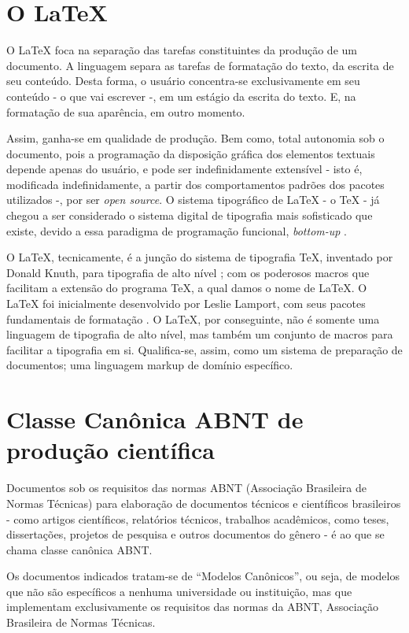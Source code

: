 \documentclass[
12pt,				%
openright,			%
oneside,			%
a4paper,			%
english,			%
french,				%
spanish,			%
brazil,				%
]{abntex2}
\begin{document}
\section{O \LaTeX}

O \LaTeX{} foca na separação das tarefas constituintes da produção de um
documento. A linguagem separa as tarefas de formatação do texto, da
escrita de seu conteúdo. Desta forma, o usuário concentra-se
exclusivamente em seu conteúdo - o que vai escrever -, em um
estágio da escrita do texto. E, na formatação de sua aparência, em
outro momento.

Assim, ganha-se em
qualidade de produção. Bem como, total autonomia sob o documento, pois
a programação da disposição gráfica dos elementos textuais depende apenas do usuário, e
pode ser indefinidamente extensível - isto é, modificada indefinidamente, a partir dos
comportamentos padrões dos pacotes utilizados -, por ser \textit{open source}. O sistema tipográfico de \LaTeX{} - o
\TeX{} - já chegou a ser considerado o sistema digital de
tipografia mais sofisticado que existe, devido a essa paradigma de
programação funcional, \textit{bottom-up} \cite{haralambous2007}.

O \LaTeX, tecnicamente, é a junção do sistema de tipografia \TeX,
inventado por Donald Knuth, para tipografia de alto nível
\cite{knuth1986}; com os poderosos macros que facilitam a extensão do programa \TeX, a qual damos o nome de
\LaTeX. O \LaTeX{} foi inicialmente desenvolvido por Leslie Lamport, com
seus pacotes fundamentais de formatação \cite{lamport1994}. O \LaTeX,
por conseguinte, não é somente uma linguagem de tipografia de alto
nível, mas também um conjunto de macros para facilitar a tipografia em
si. Qualifica-se, assim, como um sistema de preparação de documentos;
uma linguagem markup de domínio específico.

\section{Classe Canônica ABNT de produção científica}

Documentos sob os requisitos das normas ABNT (Associação Brasileira de Normas
Técnicas) para elaboração de documentos técnicos e científicos
brasileiros - como artigos científicos, relatórios técnicos, trabalhos
acadêmicos, como teses, dissertações, projetos de pesquisa e outros
documentos do gênero \cite{abntex2012} - é ao que se chama classe
canônica ABNT.

\begin{citacao}
  Os documentos indicados tratam-se de “Modelos Canônicos”, ou seja,
  de modelos que não são específicos a nenhuma universidade ou instituição, mas
  que implementam exclusivamente os requisitos das normas da ABNT, Associação
  Brasileira de Normas Técnicas. \cite[Cap. 1]{araujoclasse}
\end{citacao}
\end{document}
